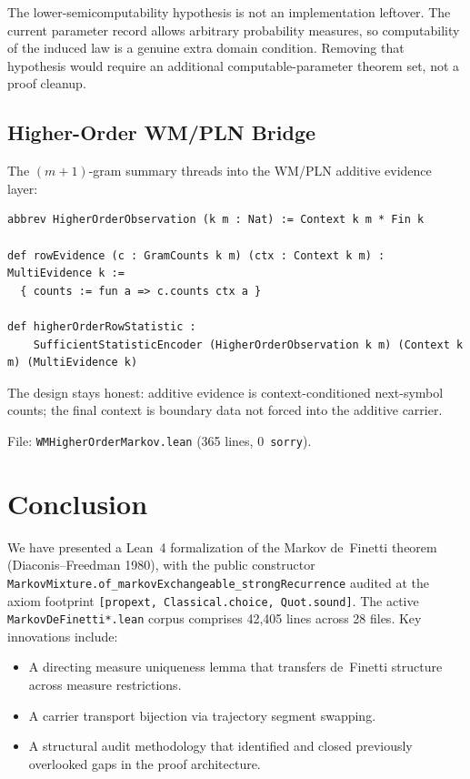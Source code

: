 \documentclass[11pt,a4paper]{article}
\theoremstyle{definition}
\begin{document}
The lower-semicomputability hypothesis is not an implementation leftover.  The
current parameter record allows arbitrary probability measures, so computability
of the induced law is a genuine extra domain condition.  Removing that
hypothesis would require an additional computable-parameter theorem set, not a
proof cleanup.

\subsection{Higher-Order WM/PLN Bridge}

The $(m+1)$-gram summary threads into the WM/PLN additive evidence layer:

\begin{lstlisting}
abbrev HigherOrderObservation (k m : Nat) := Context k m * Fin k

def rowEvidence (c : GramCounts k m) (ctx : Context k m) : MultiEvidence k :=
  { counts := fun a => c.counts ctx a }

def higherOrderRowStatistic :
    SufficientStatisticEncoder (HigherOrderObservation k m) (Context k m) (MultiEvidence k)
\end{lstlisting}

The design stays honest: additive evidence is context-conditioned next-symbol
counts; the final context is boundary data not forced into the additive carrier.

File: \texttt{WMHigherOrderMarkov.lean} (365 lines, 0~\texttt{sorry}).

\section{Conclusion}

We have presented a Lean~4 formalization of the Markov de~Finetti theorem
(Diaconis--Freedman 1980), with the public constructor
\texttt{MarkovMixture.of\_markovExchangeable\_strongRecurrence} audited at
the axiom footprint \texttt{[propext, Classical.choice, Quot.sound]}. The
active \texttt{MarkovDeFinetti*.lean} corpus comprises 42,405 lines across
28 files. Key innovations include:

\begin{itemize}
\item A directing measure uniqueness lemma that transfers de~Finetti structure
  across measure restrictions.
\item A carrier transport bijection via trajectory segment swapping.
\item A structural audit methodology that identified and closed previously
  overlooked gaps in the proof architecture.
\end{itemize}
\end{document}
